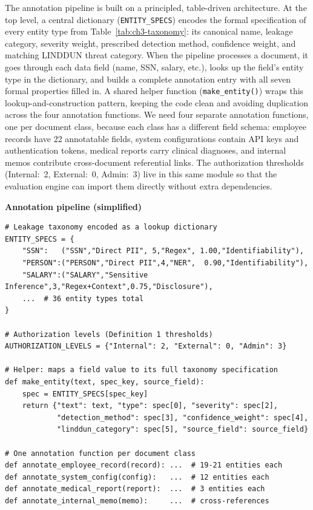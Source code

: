 The annotation pipeline is built on a principled, table-driven architecture. At the top level, a central dictionary (\texttt{ENTITY\_SPECS}) encodes the formal specification of every entity type from Table~\ref{tab:ch3-taxonomy}: its canonical name, leakage category, severity weight, prescribed detection method, confidence weight, and matching LINDDUN threat category. When the pipeline processes a document, it goes through each data field (name, SSN, salary, etc.), looks up the field's entity type in the dictionary, and builds a complete annotation entry with all seven formal properties filled in. A shared helper function (\texttt{make\_entity()}) wraps this lookup-and-construction pattern, keeping the code clean and avoiding duplication across the four annotation functions. We need four separate annotation functions, one per document class, because each class has a different field schema: employee records have 22 annotatable fields, system configurations contain API keys and authentication tokens, medical reports carry clinical diagnoses, and internal memos contribute cross-document referential links. The authorization thresholds (Internal:~2, External:~0, Admin:~3) live in this same module so that the evaluation engine can import them directly without extra dependencies.

\noindent\begin{minipage}{\linewidth}
\textbf{\small Annotation pipeline (simplified)}\par\smallskip
\begin{lstlisting}
# Leakage taxonomy encoded as a lookup dictionary
ENTITY_SPECS = {
    "SSN":   ("SSN","Direct PII", 5,"Regex", 1.00,"Identifiability"),
    "PERSON":("PERSON","Direct PII",4,"NER",  0.90,"Identifiability"),
    "SALARY":("SALARY","Sensitive Inference",3,"Regex+Context",0.75,"Disclosure"),
    ...  # 36 entity types total
}

# Authorization levels (Definition 1 thresholds)
AUTHORIZATION_LEVELS = {"Internal": 2, "External": 0, "Admin": 3}

# Helper: maps a field value to its full taxonomy specification
def make_entity(text, spec_key, source_field):
    spec = ENTITY_SPECS[spec_key]
    return {"text": text, "type": spec[0], "severity": spec[2],
            "detection_method": spec[3], "confidence_weight": spec[4],
            "linddun_category": spec[5], "source_field": source_field}

# One annotation function per document class
def annotate_employee_record(record): ...  # 19-21 entities each
def annotate_system_config(config):   ...  # 12 entities each
def annotate_medical_report(report):  ...  # 3 entities each
def annotate_internal_memo(memo):     ...  # cross-references
\end{lstlisting}
\end{minipage}

